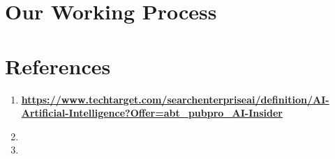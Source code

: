 \documentclass[
]{book}
\begin{document}
\hypertarget{our-working-process}{%
\chapter{Our Working Process}\label{our-working-process}}

\hypertarget{references}{%
\chapter{References}\label{references}}

\begin{enumerate}
\def\labelenumi{(\arabic{enumi})}
\item
  \href{https://www.techtarget.com/searchenterpriseai/definition/AI-Artificial-Intelligence?Offer=abt_pubpro_AI-Insider}{\textbf{https://www.techtarget.com/searchenterpriseai/definition/AI-Artificial-Intelligence?Offer=abt\_pubpro\_AI-Insider}}
\item
\item
\end{enumerate}

  
\end{document}
